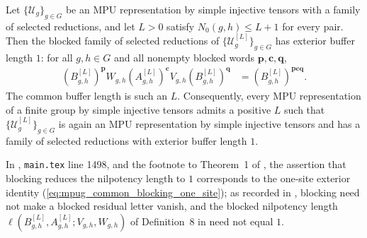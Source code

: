\begin{lemma}
    \label{thm:mpug_common_blocking_one_site}
    \leanok
    Let $\{\mathcal U_g\}_{g\in G}$ be an MPU representation by simple
    injective tensors with a family of selected reductions, and let $L>0$
    satisfy $N_0(g,h)\leq L+1$ for every pair.  Then the blocked family of
    selected reductions of $\{\mathcal U_g^{[L]}\}_{g\in G}$ has exterior
    buffer length $1$: for all $g,h\in G$ and all nonempty blocked words
    $\mathbf p,\mathbf c,\mathbf q$,
    \begin{align}
        (B_{g,h}^{[L]})^{\mathbf p}W_{g,h}(A_{g,h}^{[L]})^{\mathbf c}
        V_{g,h}(B_{g,h}^{[L]})^{\mathbf q}
         & =(B_{g,h}^{[L]})^{\mathbf p\mathbf c\mathbf q}.
        \label{eq:mpug_common_blocking_one_site}
    \end{align}
    The common buffer length is such an $L$.  Consequently, every MPU
    representation of a finite group by simple injective tensors admits a
    positive $L$ such that $\{\mathcal U_g^{[L]}\}_{g\in G}$ is again an MPU
    representation by simple injective tensors and has a family of selected
    reductions with exterior buffer length $1$.

    In \cite{FrancoRubio2025MPUGauging}, \texttt{main.tex} line 1498, and the
    footnote to Theorem~1 of \cite{GarreRubioSchuch2024DomainWall}, the
    assertion that blocking reduces the nilpotency length to $1$ corresponds to
    the one-site exterior identity (\ref{eq:mpug_common_blocking_one_site}); as
    recorded in \cite{gap:mgsc18_nilpotency_length_one_terminology}, blocking
    need not make a blocked residual letter vanish, and the blocked nilpotency
    length $\ell(B_{g,h}^{[L]},A_{g,h}^{[L]};V_{g,h},W_{g,h})$ of Definition~8
    in \cite{Molnar2018SemiInjective} need not equal $1$.
\end{lemma}

